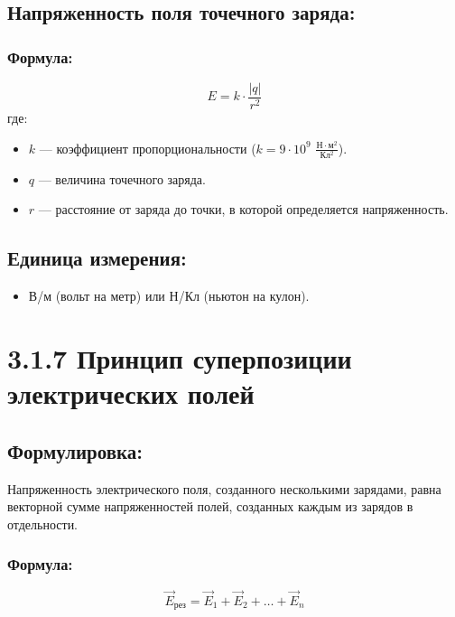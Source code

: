 \documentclass[a4paper,12pt]{article}
\begin{document}
\vspace{-9pt}
\subsection*{Напряженность поля точечного заряда:}
\vspace{-3pt}
\subsubsection*{Формула:}
\vspace{-0.05em}
$$ E = k \cdot \frac{|q|}{r^2} $$
где:
\begin{itemize}
    \item $k$ — коэффициент пропорциональности ($k = 9 \cdot 10^9$ $\frac{Н \cdot м^2}{Кл^2}$).
    \item $q$ — величина точечного заряда.
    \item $r$ — расстояние от заряда до точки, в которой определяется напряженность.
\end{itemize}


\vspace{-9pt}
\subsection*{Единица измерения:}
\vspace{-3pt}
\begin{itemize}
    \item В/м (вольт на метр) или Н/Кл (ньютон на кулон).
\end{itemize}

\newpage
\section*{3.1.7 Принцип суперпозиции электрических полей}
\vspace{-9pt}
\subsection*{Формулировка:}
\vspace{-3pt}
Напряженность электрического поля, созданного несколькими зарядами, равна векторной сумме напряженностей полей, созданных каждым из зарядов в отдельности.

\vspace{-9pt}
\subsubsection*{Формула:}
\vspace{-0.05em}
$$ \vec{E}_{\text{рез}} = \vec{E}_1 + \vec{E}_2 + \dots + \vec{E}_n $$
\end{document}
